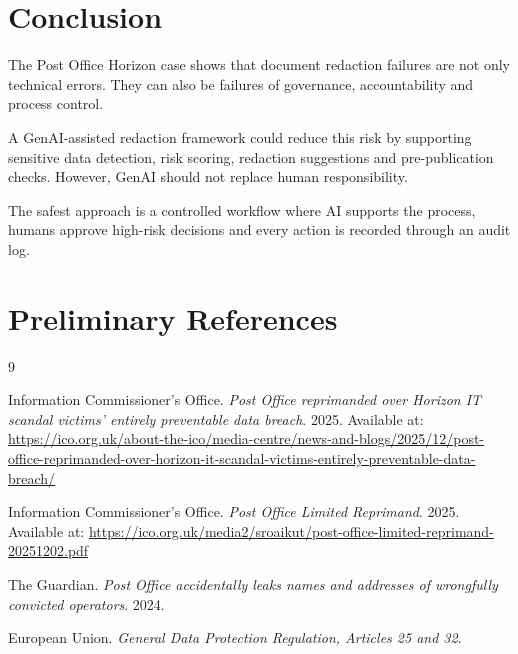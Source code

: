 \documentclass[12pt,a4paper]{article}
\begin{document}
\section{Conclusion}

The Post Office Horizon case shows that document redaction failures are not only technical errors. They can also be failures of governance, accountability and process control.

A GenAI-assisted redaction framework could reduce this risk by supporting sensitive data detection, risk scoring, redaction suggestions and pre-publication checks. However, GenAI should not replace human responsibility.

\begin{principlebox}
The safest approach is a controlled workflow where AI supports the process, humans approve high-risk decisions and every action is recorded through an audit log.
\end{principlebox}

\section{Preliminary References}

\begin{thebibliography}{9}

Information Commissioner's Office.
\textit{Post Office reprimanded over Horizon IT scandal victims' entirely preventable data breach}.
2025.
Available at: \url{https://ico.org.uk/about-the-ico/media-centre/news-and-blogs/2025/12/post-office-reprimanded-over-horizon-it-scandal-victims-entirely-preventable-data-breach/}

Information Commissioner's Office.
\textit{Post Office Limited Reprimand}.
2025.
Available at: \url{https://ico.org.uk/media2/sroaikut/post-office-limited-reprimand-20251202.pdf}

The Guardian.
\textit{Post Office accidentally leaks names and addresses of wrongfully convicted operators}.
2024.

European Union.
\textit{General Data Protection Regulation, Articles 25 and 32}.

\end{thebibliography}
\end{document}
